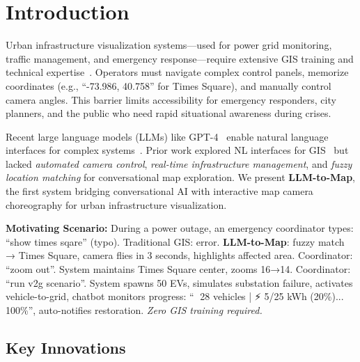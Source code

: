 \documentclass[sigconf]{acmart}
\begin{document}

\maketitle

\section{Introduction}

Urban infrastructure visualization systems—used for power grid monitoring, traffic management, and emergency response—require extensive GIS training and technical expertise~\cite{longley2005geographic}. Operators must navigate complex control panels, memorize coordinates (e.g., ``-73.986, 40.758'' for Times Square), and manually control camera angles. This barrier limits accessibility for emergency responders, city planners, and the public who need rapid situational awareness during crises.

Recent large language models (LLMs) like GPT-4~\cite{achiam2023gpt} enable natural language interfaces for complex systems~\cite{zhou2023comprehensive,wei2022chain}. Prior work explored NL interfaces for GIS~\cite{popescu2003natural,liu2023llm,roberts2023gpt} but lacked \textit{automated camera control}, \textit{real-time infrastructure management}, and \textit{fuzzy location matching} for conversational map exploration. We present \textbf{LLM-to-Map}, the first system bridging conversational AI with interactive map camera choreography for urban infrastructure visualization.

\textbf{Motivating Scenario:} During a power outage, an emergency coordinator types: ``show times sqare'' (typo). Traditional GIS: error. \textbf{LLM-to-Map}: fuzzy match → Times Square, camera flies in 3 seconds, highlights affected area. Coordinator: ``zoom out''. System maintains Times Square center, zooms 16→14. Coordinator: ``run v2g scenario''. System spawns 50 EVs, simulates substation failure, activates vehicle-to-grid, chatbot monitors progress: ``🚗 28 vehicles | ⚡ 5/25 kWh (20\%)... 100\%'', auto-notifies restoration. \textit{Zero GIS training required.}

\subsection{Key Innovations}
\end{document}
